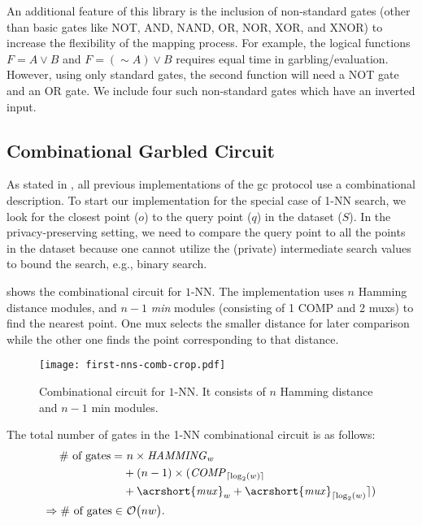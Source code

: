 An additional feature of this library is the inclusion of non-standard gates (other than basic gates like NOT, AND, NAND, OR, NOR, XOR, and XNOR) to increase the flexibility of the mapping process.
For example, the logical functions $F = A\vee B$ and $F = (\sim A)\vee B$ requires equal time in garbling/evaluation.
However, using only standard gates, the second function will need a NOT gate and an OR gate.
We include four such non-standard gates which have an inverted input.

\subsection{Combinational Garbled Circuit}\label{ssec:knn-combgc}
As stated in , all previous implementations of the \acrshort{gc} protocol use a combinational description.
To start our implementation for the special case of 1-NN search, we look for the closest point ($o$) to the query point ($q$) in the dataset ($S$).
In the privacy-preserving setting, we need to compare the query point to all the points in the dataset because one cannot utilize the (private) intermediate search values to bound the search, e.g., binary search.

 shows the combinational circuit for $1$-NN.
The implementation uses $n$ Hamming distance modules, and $n-1$ \emph{min} modules (consisting of 1 COMP and 2 \acrshort{mux}s) to find the nearest point.
One \acrshort{mux} selects the smaller distance for later comparison while the other one finds the point corresponding to that distance.

\begin{figure}
\centering
\texttt{[image: first-nns-comb-crop.pdf]}
\caption{Combinational circuit for $1$-NN.
It consists of $n$ Hamming distance and $n-1$ min modules.}
\label{fig:fist-nns-comb}
\end{figure}

The total number of gates in the 1-NN combinational circuit is as follows:
\begin{align*}
\text{\# of gates} =& ~	n \times \mathit{HAMMING}_{w}\\
					& + (n-1) \times (\mathit{COMP}_{\lceil \log _2(w) \rceil} \\
					& + \mathit{\acrshort{mux}}_w + \mathit{\acrshort{mux}}_{\lceil \log _2(w)} \rceil)\\
\Rightarrow \text{\# of gates} \in & ~\BigO{nw}.
\end{align*}

